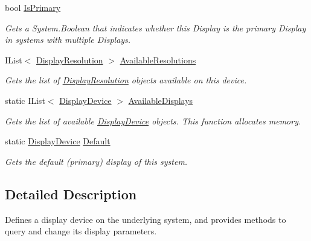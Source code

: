 \begin{DoxyCompactItemize}
bool \hyperlink{class_open_t_k_1_1_display_device_a45910e472c9487f77a80d2eaf699b0cf}{Is\-Primary}
\begin{DoxyCompactList}\small\item\em Gets a System.\-Boolean that indicates whether this Display is the primary Display in systems with multiple Displays.\end{DoxyCompactList}\item 
I\-List$<$ \hyperlink{class_open_t_k_1_1_display_resolution}{Display\-Resolution} $>$ \hyperlink{class_open_t_k_1_1_display_device_a804b7e126c368b782811bc458019a7cd}{Available\-Resolutions}
\begin{DoxyCompactList}\small\item\em Gets the list of \hyperlink{class_open_t_k_1_1_display_resolution}{Display\-Resolution} objects available on this device. \end{DoxyCompactList}\item 
static I\-List$<$ \hyperlink{class_open_t_k_1_1_display_device}{Display\-Device} $>$ \hyperlink{class_open_t_k_1_1_display_device_afd22a63fc37c530c7fd19886d439d04c}{Available\-Displays}
\begin{DoxyCompactList}\small\item\em Gets the list of available \hyperlink{class_open_t_k_1_1_display_device}{Display\-Device} objects. This function allocates memory. \end{DoxyCompactList}\item 
static \hyperlink{class_open_t_k_1_1_display_device}{Display\-Device} \hyperlink{class_open_t_k_1_1_display_device_a2148505e367fc6d6d66ebfd80a9e91e5}{Default}
\begin{DoxyCompactList}\small\item\em Gets the default (primary) display of this system.\end{DoxyCompactList}\end{DoxyCompactItemize}


\subsection{Detailed Description}
Defines a display device on the underlying system, and provides methods to query and change its display parameters. 



